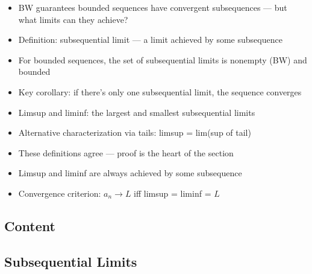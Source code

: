 \documentclass[
  10pt,
  letterpaper,
]{scrbook}
\providecommand{\tightlist}{%
  \setlength{\itemsep}{0pt}\setlength{\parskip}{0pt}}
\begin{document}
\begin{itemize}
\tightlist
\item
  BW guarantees bounded sequences have convergent subsequences --- but
  what limits can they achieve?
\item
  Definition: subsequential limit --- a limit achieved by some
  subsequence
\item
  For bounded sequences, the set of subsequential limits is nonempty
  (BW) and bounded
\item
  Key corollary: if there's only one subsequential limit, the sequence
  converges
\item
  Limsup and liminf: the largest and smallest subsequential limits
\item
  Alternative characterization via tails: limsup = lim(sup of tail)
\item
  These definitions agree --- proof is the heart of the section
\item
  Limsup and liminf are always achieved by some subsequence
\item
  Convergence criterion: \(a_n \to L\) iff limsup = liminf = \(L\)
\end{itemize}

\subsection{Content}\label{content-12}

\subsection{Subsequential Limits}\label{subsequential-limits-1}
\end{document}
